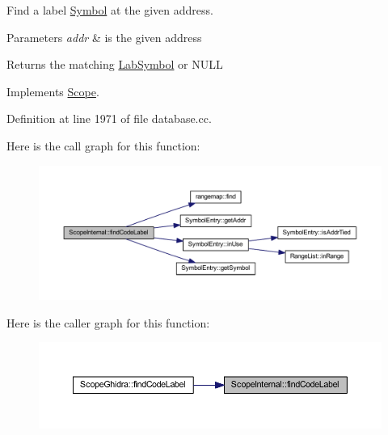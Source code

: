 Find a label \mbox{\hyperlink{class_symbol}{Symbol}} at the given address. 


\begin{DoxyParams}{Parameters}
{\em addr} & is the given address \\
\hline
\end{DoxyParams}
\begin{DoxyReturn}{Returns}
the matching \mbox{\hyperlink{class_lab_symbol}{Lab\+Symbol}} or N\+U\+LL 
\end{DoxyReturn}


Implements \mbox{\hyperlink{class_scope_af4bac52b9d64974b87432c0379cc38c6}{Scope}}.



Definition at line 1971 of file database.\+cc.

Here is the call graph for this function\+:
\nopagebreak
\begin{figure}[H]
\begin{center}
\leavevmode
\includegraphics[width=350pt]{class_scope_internal_a602029280a3bc0dac8aac016ec934d5b_cgraph}
\end{center}
\end{figure}
Here is the caller graph for this function\+:
\nopagebreak
\begin{figure}[H]
\begin{center}
\leavevmode
\includegraphics[width=350pt]{class_scope_internal_a602029280a3bc0dac8aac016ec934d5b_icgraph}
\end{center}
\end{figure}
\mbox{\label{class_scope_internal_ae1eedf2f27fd8b0a7431568c4e4e2994}} 
